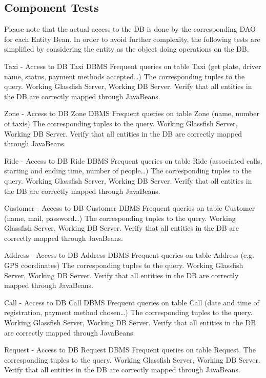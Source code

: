 \subsection{Component Tests} 
Please note that the actual access to the DB is done by the corresponding DAO for each Entity Bean. In order to avoid further complexity, the following tests are simplified by considering the entity as the object doing operations on the DB. %
\label{sub:component_tests}

\testx
{Taxi - Access to DB}
{Taxi}
{DBMS}
{Frequent queries on table Taxi (get plate, driver name, status, payment methods accepted\ldots)}
{The corresponding tuples to the query.}
{Working Glassfish Server, Working DB Server.}
{Verify that all entities in the DB are correctly mapped through JavaBeans.}

\testx
{Zone - Access to DB}
{Zone}
{DBMS}
{Frequent queries on table Zone (name, number of taxis)}
{The corresponding tuples to the query.}
{Working Glassfish Server, Working DB Server.}
{Verify that all entities in the DB are correctly mapped through JavaBeans.}

\testx
{Ride - Access to DB}
{Ride}
{DBMS}
{Frequent queries on table Ride (associated calls, starting and ending time, number of people\ldots)}
{The corresponding tuples to the query.}
{Working Glassfish Server, Working DB Server.}
{Verify that all entities in the DB are correctly mapped through JavaBeans.}

\testx
{Customer - Access to DB}
{Customer}
{DBMS}
{Frequent queries on table Customer (name, mail, password\ldots)}
{The corresponding tuples to the query.}
{Working Glassfish Server, Working DB Server.}
{Verify that all entities in the DB are correctly mapped through JavaBeans.}

\testx
{Address - Access to DB}
{Address}
{DBMS}
{Frequent queries on table Address (e.g. GPS coordinates)}
{The corresponding tuples to the query.}
{Working Glassfish Server, Working DB Server.}
{Verify that all entities in the DB are correctly mapped through JavaBeans.}

\testx
{Call - Access to DB}
{Call}
{DBMS}
{Frequent queries on table Call (date and time of registration, payment method chosen\ldots)}
{The corresponding tuples to the query.}
{Working Glassfish Server, Working DB Server.}
{Verify that all entities in the DB are correctly mapped through JavaBeans.}

\testx
{Request - Access to DB}
{Request}
{DBMS}
{Frequent queries on table Request.}
{The corresponding tuples to the query.}
{Working Glassfish Server, Working DB Server.}
{Verify that all entities in the DB are correctly mapped through JavaBeans.}

